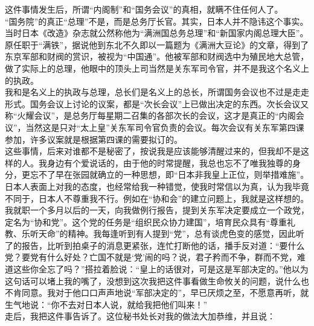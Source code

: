 这件事情发生后，所谓“内阁制”和“国务会议”的真相，就瞒不住任何人了。\\

“国务院”的真正“总理”不是，而是总务厅长官。其实，日本人并不隐讳这个事实。当时日本《改造》杂志就公然称他为“满洲国总务总理”和“新国家内阁总理大臣”。原任职于“满铁”，据说他到东北不久即以一篇题为《满洲大豆论》的文章，得到了东京军部和财阀的赏识，被视为“中国通”。他被军部和财阀选中为殖民地大总管，做了实际上的总理，他眼中的顶头上司当然是关东军司令官，并不是我这个名义上的执政。\\

我和是名义上的执政与总理，总长们是名义上的总长，所谓国务会议也不过是走走形式。国务会议上讨论的议案，都是“次长会议”上已做出决定的东西。次长会议又称“火耀会议”，是总务厅每星期二召集的各部次长的会议，这才是真正的“内阁会议”，当然这是只对“太上皇”关东军司令官负责的会议。每次会议有关东军第四课参加，许多议案就是根据第四课的需要拟订的。\\

这些事情，后来对谁都不是秘密了，按说我是应该能够清醒过来的，但我却不是这样的人。我身边有个爱说话的，由于他的时常提醒，我总也忘不了唯我独尊的身分，更忘不了早在张园就确立的一种思想，即“日本非我皇上正位，则举措难施”。日本人表面上对我的态度，也经常给我一种错觉，使我时常信以为真，认为我毕竟不同于，日本人不尊重我不行。例如在“协和会”的建立问题上，我就是这样想的。\\

我就职一个多月以后的一天，向我做例行报告，提到关东军决定要成立一个政党，定名为“协和党”。这个党的任务是“组织民众协力建国”，培育民众具有“尊重礼教、乐听天命”的精神。我每逢听到有人提到“党”，总有谈虎色变的感觉，因此听了的报告，比听到拍桌子的消息更紧张，连忙打断他的话，播手反对道：“要什么党？要党有什么好处？亡国不就是‘党’闹的吗？说，君子矜而不争，群而不党，难道这些你全忘了吗？”搭拉着脸说：“皇上的话很对，可是这是军部决定的。”他以为这句话可以堵上我的嘴了，没想到这次我把这件事看做生命攸关的问题，说什么也不肯同意。我对于他口口声声地说“军部决定的”，早已厌烦之至，不愿意再听，就生气地说：“你不去对日本人说，就给我把他们叫来！”\\

走后，我把这件事告诉了。这位秘书处长对我的做法大加恭维，并且说：\\


